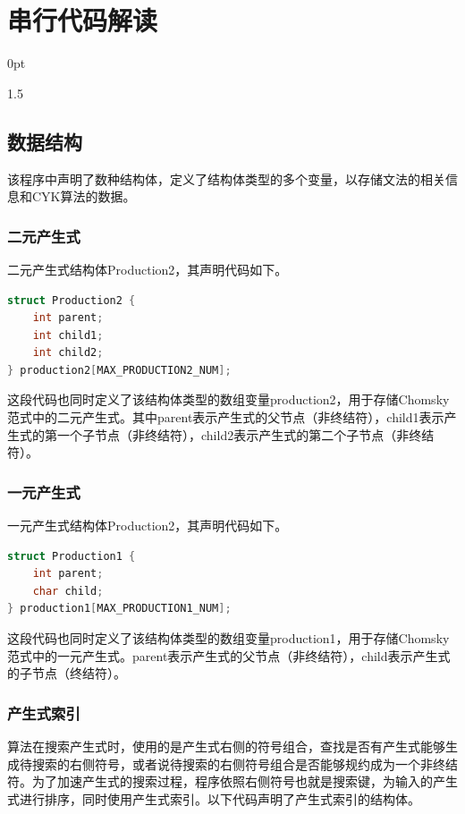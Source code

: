 \documentclass[zihao=-4]{ctexart}
\newcommand{\setParDis}{\setlength {\parskip} {0pt} }
\begin{document}
\section{串行代码解读}
\setParDis %
\begin{spacing}{1.5}

\subsection{数据结构}

该程序中声明了数种结构体，定义了结构体类型的多个变量，以存储文法的相关信息和CYK算法的数据。

\subsubsection{二元产生式}

二元产生式结构体Production2，其声明代码如下。

\begin{lstlisting}[language=C++,title={二元产生式声明与定义}]
struct Production2 {
    int parent;
    int child1;
    int child2;
} production2[MAX_PRODUCTION2_NUM];
\end{lstlisting}

这段代码也同时定义了该结构体类型的数组变量production2，用于存储Chomsky范式中的二元产生式。其中parent表示产生式的父节点（非终结符），child1表示产生式的第一个子节点（非终结符），child2表示产生式的第二个子节点（非终结符）。

\subsubsection{一元产生式}

一元产生式结构体Production2，其声明代码如下。

\begin{lstlisting}[language=C++,title={一元产生式声明与定义}]
struct Production1 {
    int parent;
    char child;
} production1[MAX_PRODUCTION1_NUM];
\end{lstlisting}

这段代码也同时定义了该结构体类型的数组变量production1，用于存储Chomsky范式中的一元产生式。parent表示产生式的父节点（非终结符），child表示产生式的子节点（终结符）。

\subsubsection{产生式索引}

算法在搜索产生式时，使用的是产生式右侧的符号组合，查找是否有产生式能够生成待搜索的右侧符号，或者说待搜索的右侧符号组合是否能够规约成为一个非终结符。为了加速产生式的搜索过程，程序依照右侧符号也就是搜索键，为输入的产生式进行排序，同时使用产生式索引。以下代码声明了产生式索引的结构体。


\end{spacing}
\end{document}
